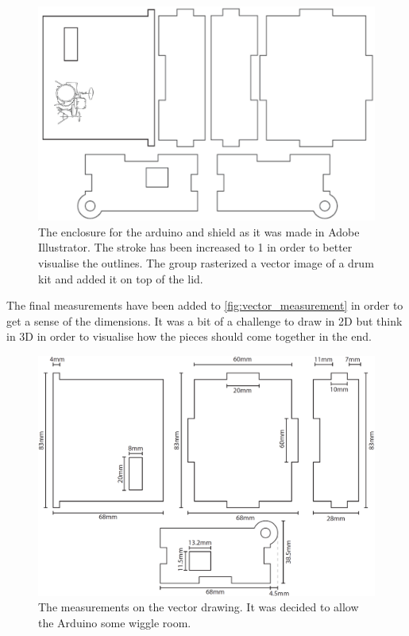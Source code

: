 \begin{figure}[htb]
\centering
\includegraphics[width = \textwidth]{Figure/vector_case.png}
\caption{The enclosure for the arduino and shield as it was made in Adobe Illustrator. The stroke has been increased to 1 in order to better visualise the outlines. The group rasterized a vector image of a drum kit and added it on top of the lid.}
\label{fig:vector_case}
\end{figure}

The final measurements have been added to \autoref{fig:vector_measurement} in order to get a sense of the dimensions. It was a bit of a challenge to draw in 2D but think in 3D in order to visualise how the pieces should come together in the end.

\begin{figure}[htb]
\centering
\includegraphics[width = \textwidth]{Figure/vector_case_measure.png}
\caption{The measurements on the vector drawing. It was decided to allow the Arduino some wiggle room.}
\label{fig:vector_measurement}
\end{figure}
